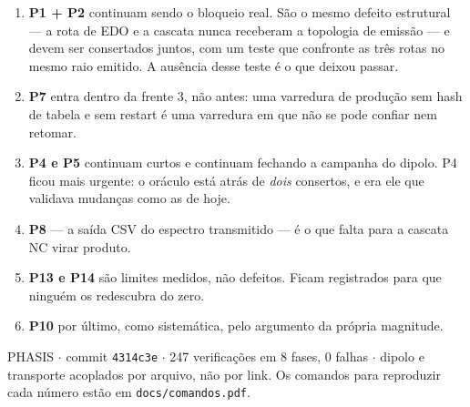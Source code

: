 \documentclass[10pt,a4paper]{article}
\begin{document}
\begin{enumerate}[leftmargin=*,itemsep=3.5pt,topsep=3pt]
\item \textbf{P1 + P2} continuam sendo o bloqueio real. São o mesmo
defeito estrutural --- a rota de EDO e a cascata nunca receberam a
topologia de emissão --- e devem ser consertados juntos, com um teste que
confronte as três rotas no mesmo raio emitido. A ausência desse teste é o
que deixou passar.

\item \textbf{P7} entra dentro da frente 3, não antes: uma varredura de
produção sem hash de tabela e sem restart é uma varredura em que não se
pode confiar nem retomar.

\item \textbf{P4 e P5} continuam curtos e continuam fechando a campanha
do dipolo. P4 ficou mais urgente: o oráculo está atrás de \emph{dois}
consertos, e era ele que validava mudanças como as de hoje.

\item \textbf{P8} --- a saída CSV do espectro transmitido --- é o que
falta para a cascata NC virar produto.

\item \textbf{P13 e P14} são limites medidos, não defeitos. Ficam
registrados para que ninguém os redescubra do zero.

\item \textbf{P10} por último, como sistemática, pelo argumento da
própria magnitude.
\end{enumerate}

\vspace{10pt}{\color{borda}\rule{\linewidth}{0.4pt}}\par\vspace{4pt}
{\footnotesize\color{cinza}
PHASIS $\cdot$ commit \texttt{4314c3e} $\cdot$ 247 verificações em 8
fases, 0 falhas $\cdot$ dipolo e transporte acoplados por arquivo, não
por link. Os comandos para reproduzir cada número estão em
\texttt{docs/comandos.pdf}.}
\end{document}
